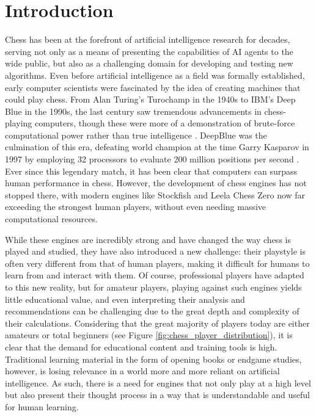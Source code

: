 \chapter{Introduction}
\label{chapter:introduction}
Chess has been at the forefront of artificial intelligence research for decades, serving not only as a means of presenting the capabilities of AI agents to the wide public, but also as a challenging domain for developing and testing new algorithms.
Even before artificial intelligence as a field was formally established, early computer scientists were fascinated by the idea of creating machines that could play chess.
From Alan Turing's Turochamp in the 1940s to IBM's Deep Blue in the 1990s, the last century saw tremendous advancements in chess-playing computers, though these were more of a demonstration of brute-force computational power rather than true intelligence \cite{chess_computer_history}.
DeepBlue was the culmination of this era, defeating world champion at the time Garry Kasparov in 1997 by employing 32 processors to evaluate 200 million positions per second \cite{deepblue}.
Ever since this legendary match, it has been clear that computers can surpass human performance in chess.
However, the development of chess engines has not stopped there, with modern engines like Stockfish \cite{stockfish} and Leela Chess Zero \cite{leela} now far exceeding the strongest human players, without even needing massive computational resources.

While these engines are incredibly strong and have changed the way chess is played and studied, they have also introduced a new challenge: their playstyle is often very different from that of human players, making it difficult for humans to learn from and interact with them.
Of course, professional players have adapted to this new reality, but for amateur players, playing against such engines yields little educational value, and even interpreting their analysis and recommendations can be challenging due to the great depth and complexity of their calculations.
Considering that the great majority of players today are either amateurs or total beginners (see Figure \ref{fig:chess_player_distribution}), it is clear that the demand for educational content and training tools is high.
Traditional learning material in the form of opening books or endgame studies, however, is losing relevance in a world more and more reliant on artificial intelligence.
As such, there is a need for engines that not only play at a high level but also present their thought process in a way that is understandable and useful for human learning.

